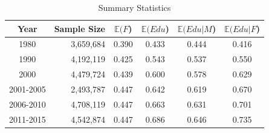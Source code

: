 \documentclass[beamer, t]{beamer}
\begin{document}
\begin{frame}
	
	\begin{table}[ht]
		\caption{Summary Statistics} \label{tb:summary_stat}
		\centering
		\begin{tabular}{crcccc}
			\hline
			Year & Sample Size & $\mathbb E(F$) & $\mathbb E(Edu$) & $\mathbb E(Edu|M$) & $\mathbb E(Edu|F$) \\ 
			\hline
			1980      & 3,659,684 & 0.390 & 0.433 & 0.444 & 0.416 \\ 
			1990      & 4,192,119 & 0.425 & 0.543 & 0.537 & 0.550 \\ 
			2000      & 4,479,724 & 0.439 & 0.600 & 0.578 & 0.629 \\ 
			2001-2005 & 2,493,787 & 0.447 & 0.642 & 0.619 & 0.670 \\ 
			2006-2010 & 4,708,119 & 0.447 & 0.663 & 0.631 & 0.701 \\ 
			2011-2015 & 4,542,874 & 0.447 & 0.686 & 0.646 & 0.735 \\ 
			\hline
		\end{tabular}
	\end{table}
	
	
\end{frame}
\end{document}
